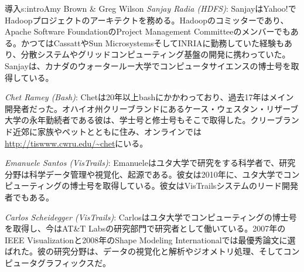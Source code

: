 \begin{aosachapter}{導入}{s:intro}{Amy Brown \& Greg Wilson}
\emph{Sanjay Radia (HDFS)}: SanjayはYahoo!でHadoopプロジェクトのアーキテクトを務める。Hadoopのコミッターであり、Apache Software FoundationのProject Management Committeeのメンバーでもある。かつてはCassattやSun MicrosystemsそしてINRIAに勤務していた経験もあり、分散システムやグリッドコンピューティング基盤の開発に携わっていた。Sanjayは、カナダのウォータールー大学でコンピュータサイエンスの博士号を取得している。

\emph{Chet Ramey (Bash)}: Chetは20年以上bashにかかわっており、過去17年はメイン開発者だった。オハイオ州クリーブランドにあるケース・ウェスタン・リザーブ大学の永年勤続者である彼は、学士号と修士号もそこで取得した。クリーブランド近郊に家族やペットとともに住み、オンラインでは\url{http://tiswww.cwru.edu/~chet}にいる。

\emph{Emanuele Santos (VisTrails)}: Emanueleはユタ大学で研究をする科学者で、研究分野は科学データ管理や視覚化、起源である。彼女は2010年に、ユタ大学でコンピューティングの博士号を取得している。彼女はVisTrailsシステムのリード開発者でもある。

\emph{Carlos Scheidegger (VisTrails)}: Carlosはユタ大学でコンピューティングの博士号を取得し、今はAT\&T Labsの研究部門で研究者として働いている。2007年のIEEE Visualizationと2008年のShape Modeling Internationalでは最優秀論文に選ばれた。彼の研究分野は、データの視覚化と解析やジオメトリ処理、そしてコンピュータグラフィックスだ。


\end{aosachapter}
